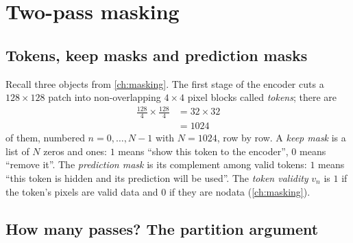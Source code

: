 \section{Two-pass masking}\label{sec:inference:twopass}

\subsection{Tokens, keep masks and prediction masks}

Recall three objects from \cref{ch:masking}. The first stage of the encoder cuts a $128\times128$ patch into
non-overlapping $4\times4$ pixel blocks called \emph{tokens}; there are
\begin{align*}
\frac{128}{4}\times\frac{128}{4} &= 32\times32\\
&= 1024
\end{align*}
of them, numbered $n=0,\dots,N-1$ with $N=1024$, row by row. A \emph{keep mask} is a list of
$N$ zeros and ones: $1$ means ``show this token to the encoder'', $0$ means ``remove it''. The
\emph{prediction mask} is its complement among valid tokens: $1$ means ``this token is
hidden and its prediction will be used''. The \emph{token validity} $v_n$ is $1$ if the
token's pixels are valid data and $0$ if they are nodata (\cref{ch:masking}).

\subsection{How many passes? The partition argument}\label{sec:inference:partition}

